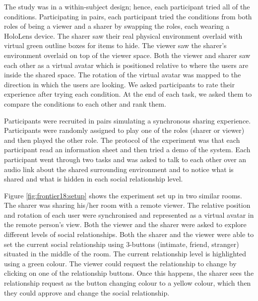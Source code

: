 The study was in a within-subject design; hence, each participant tried all of the conditions. Participating in pairs, each participant tried the conditions from both roles of being a viewer and a sharer by swapping the roles, each wearing a HoloLens device. The sharer saw their real physical environment overlaid with virtual green outline boxes for items to hide. The viewer saw the sharer's environment overlaid on top of the viewer space. Both the viewer and sharer saw each other as a virtual avatar which is positioned relative to where the users are inside the shared space. The rotation of the virtual avatar was mapped to the direction in which the users are looking. We asked participants to rate their experience after trying each condition. At the end of each task, we asked them to compare the conditions to each other and rank them. 


Participants were recruited in pairs simulating a synchronous sharing experience. Participants were randomly assigned to play one of the roles (sharer or viewer) and then played the other role. The protocol of the experiment was that each participant read an information sheet and then tried a demo of the system. Each participant went through two tasks and was asked to talk to each other over an audio link about the shared surrounding environment and to notice what is shared and what is hidden in each social relationship level. 

Figure \ref{fig:frontier18:setup} shows the experiment set up in two similar rooms. The sharer was sharing his/her room with a remote viewer. The relative position and rotation of each user were synchronised and represented as a virtual avatar in the remote person's view. 
Both the viewer and the sharer were asked to explore different levels of social relationships. Both the sharer and the viewer were able to set the current social relationship using 3-buttons (intimate, friend, stranger) situated in the middle of the room. The current relationship level is highlighted using a green colour. The viewer could request the relationship to change by clicking on one of the relationship buttons. Once this happens, the sharer sees the relationship request as the button changing colour to a yellow colour, which then they could approve and change the social relationship.


